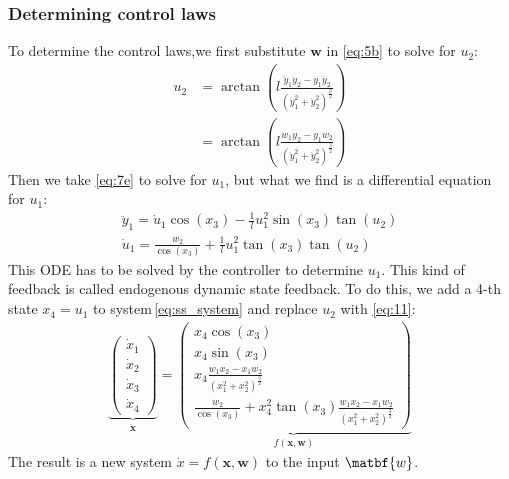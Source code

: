 \documentclass[a4paper,11pt,headings=standardclasses]{scrartcl}%
\newcommand{\x}{\mathbf{x}}
\begin{document}
\subsubsection{Determining control laws}
To determine the control laws,we first substitute $\mathbf{w}$ in \eqref{eq:5b} to solve for $u_2$:
\begin{subequations}
\label{eq:11}
\begin{align}
u_2 &= \arctan\left(l \frac{\ddot{y}_1 \dot{y}_2 - \dot{y}_1 \ddot{y}_2}{(\dot{y}_1^2+\dot{y}_2^2)^{\frac{3}{2}}} 
\right) \\
&= \arctan\left(l \frac{w_1 \dot{y}_2 - \dot{y}_1 w_2}{(\dot{y}_1^2+\dot{y}_2^2)^{\frac{3}{2}}} 
\right) 
\end{align}
\end{subequations} 
Then we take \eqref{eq:7e} to solve for $u_1$, but what we find is a differential equation for $u_1$:
\begin{subequations}
\begin{align}
\ddot{y}_1 = \dot{u}_1 \cos(x_3) - \frac{1}{l}u_1^2\sin(x_3)\tan(u_2) \\
\dot{u}_1 = \frac{w_2}{\cos(x_3)} + \frac{1}{l}u_1^2\tan(x_3)\tan(u_2)
\end{align}
\end{subequations}
This ODE  has to be solved by the controller to determine $u_1$. This kind of feedback is called endogenous dynamic state feedback. To do this, we add a 4-th state $x_4 = u_1$ to system\,\eqref{eq:ss_system} and replace $u_2$ with \eqref{eq:11}:
\begin{align}
\underbrace{\begin{pmatrix} \dot{x}_1 \\ \dot{x}_2 \\ \dot{x}_3 \\ \dot{x}_4\end{pmatrix}}_{\dot{\x}} = \underbrace{\begin{pmatrix}  x_4 \cos(x_3) \\ x_4 \sin(x_3) \\ x_4 \frac{w_1 x_2 - x_1 w_2}{(x_1^2+x_2^2)^{\frac{3}{2}}} \\ \frac{w_2}{\cos(x_3)} + x_4^2\tan(x_3) \frac{w_1 x_2 - x_1 w_2}{(x_1^2+x_2^2)^{\frac{3}{2}}}\end{pmatrix}}_{f(\x,\mathbf{w})}
\end{align}
The result is a new system $\dot{x}=f(\x,\mathbf{w})$ to the input $\matbf{w}$.
\end{document}
